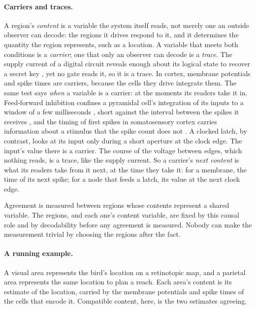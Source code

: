 \documentclass[12pt]{article}
\begin{document}
\paragraph{Carriers and traces.} A region's \emph{content} is a variable the
system itself reads, not merely one an outside observer can decode: the regions
it drives respond to it, and it determines the quantity the region represents,
such as a location. A variable that meets both conditions is a \emph{carrier};
one that only an observer can decode is a \emph{trace}. The supply current of a
digital circuit reveals enough about its logical state to recover a secret key
\citep{kocher1999}, yet no gate reads it, so it is a trace. In cortex, membrane
potentials and spike times are carriers, because the cells they drive integrate
them. The same test says \emph{when} a variable is a carrier: at the moments its
readers take it in. Feed-forward inhibition
confines a pyramidal cell's integration of its inputs to a window of a few
milliseconds \citep{pouille2001,gabernet2005}, short against the interval
between the spikes it receives \citep{konig1996}, and the timing of first spikes
in somatosensory cortex carries information about a stimulus that the spike
count does not \citep{panzeri2001}. A clocked latch, by contrast, looks at its
input only during a short aperture at the clock edge. The input's value there is
a carrier. The course of the voltage between edges, which nothing reads, is a
trace, like the supply current. So a carrier's \emph{next content} is what its
readers take from it next, at the time they take it: for a membrane, the time of
its next spike; for a node that feeds a latch, its value at the next clock edge.

Agreement is measured between regions whose contents represent a shared
variable. The regions, and each one's content variable, are fixed by this causal
role and by decodability before any agreement is measured. Nobody can make the
measurement trivial by choosing the regions after the fact.

\paragraph{A running example.} A visual area represents the bird's location on
a retinotopic map, and a parietal area represents the same location to plan a
reach. Each area's content is its estimate of the location, carried by the
membrane potentials and spike times of the cells that encode it. Compatible
content, here, is the two estimates agreeing.
\end{document}
